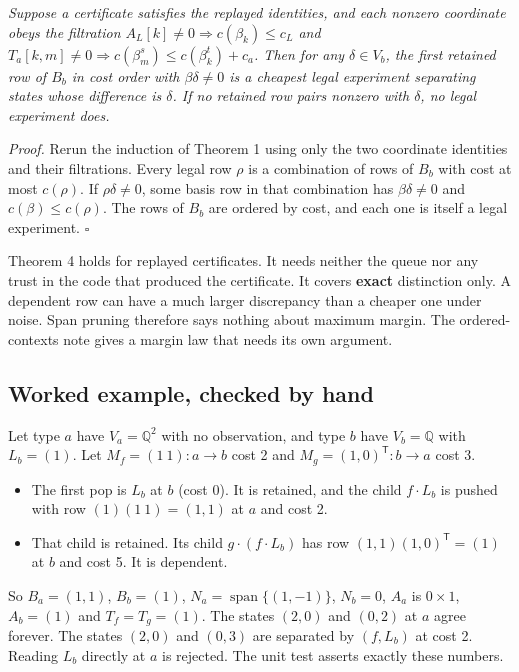 \documentclass[
  11pt,
  a4paper,
]{report}
\providecommand{\tightlist}{%
  \setlength{\itemsep}{0pt}\setlength{\parskip}{0pt}}
\let\singularitytexttt\texttt
\renewcommand{\texttt}[1]{\singularitytexttt{\seqsplit{#1}}}
\begin{document}
\emph{Suppose a certificate satisfies the replayed identities, and each
nonzero coordinate obeys the filtration
\(A_L[k]\neq0\Rightarrow c(\beta_k)\le c_L\) and
\(T_a[k,m]\neq0\Rightarrow c(\beta^{s}_m)\le c(\beta^{t}_k)+c_a\). Then
for any \(\delta\in V_b\), the first retained row of \(B_b\) in cost
order with \(\beta\delta\neq0\) is a cheapest legal experiment
separating states whose difference is \(\delta\). If no retained row
pairs nonzero with \(\delta\), no legal experiment does.}

\emph{Proof.} Rerun the induction of Theorem 1 using only the two
coordinate identities and their filtrations. Every legal row \(\rho\) is
a combination of rows of \(B_b\) with cost at most \(c(\rho)\). If
\(\rho\delta\neq0\), some basis row in that combination has
\(\beta\delta\neq0\) and \(c(\beta)\le c(\rho)\). The rows of \(B_b\)
are ordered by cost, and each one is itself a legal experiment.
\(\square\)

Theorem 4 holds for replayed certificates. It needs neither the queue
nor any trust in the code that produced the certificate. It covers
\textbf{exact} distinction only. A dependent row can have a much larger
discrepancy than a cheaper one under noise. Span pruning therefore says
nothing about maximum margin. The ordered-contexts note gives a margin
law that needs its own argument.

\hypertarget{worked-example-checked-by-hand}{%
\subsection{Worked example, checked by
hand}\label{worked-example-checked-by-hand}}

Let type \(a\) have \(V_a=\mathbb{Q}^2\) with no observation, and type
\(b\) have \(V_b=\mathbb{Q}\) with \(L_b=(1)\). Let
\(M_f=(1\ 1):a\to b\) cost 2 and \(M_g=(1,0)^{\mathsf T}:b\to a\) cost
3.

\begin{itemize}
\tightlist
\item
  The first pop is \(L_b\) at \(b\) (cost 0). It is retained, and the
  child \(f\cdot L_b\) is pushed with row \((1)(1\ 1)=(1,1)\) at \(a\)
  and cost 2.
\item
  That child is retained. Its child \(g\cdot(f\cdot L_b)\) has row
  \((1,1)(1,0)^{\mathsf T}=(1)\) at \(b\) and cost 5. It is dependent.
\end{itemize}

So \(B_a=(1,1)\), \(B_b=(1)\), \(N_a=\operatorname{span}\{(1,-1)\}\),
\(N_b=0\), \(A_a\) is \(0\times1\), \(A_b=(1)\) and \(T_f=T_g=(1)\). The
states \((2,0)\) and \((0,2)\) at \(a\) agree forever. The states
\((2,0)\) and \((0,3)\) are separated by \((f,L_b)\) at cost 2. Reading
\(L_b\) directly at \(a\) is rejected. The unit test
\texttt{test\_packet\_example\_by\_hand} asserts exactly these numbers.
\end{document}

